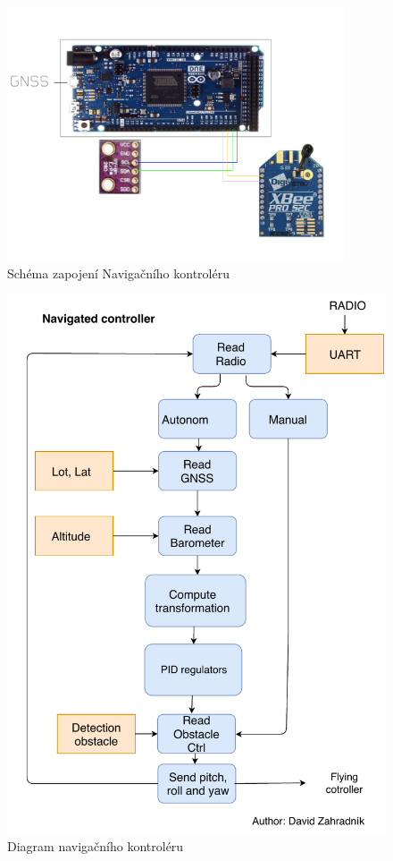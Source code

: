 \begin{figure}[H]
	\centering
	\includegraphics[width=10cm]{pictures/navictrl.pdf}
	\caption{Schéma zapojení Navigačního kontroléru}
\end{figure}
\begin{figure}[H]
	\centering
	\includegraphics[width=14cm]{pictures/NaviDiagram.pdf}
	\caption{Diagram navigačního kontroléru}
\end{figure}


